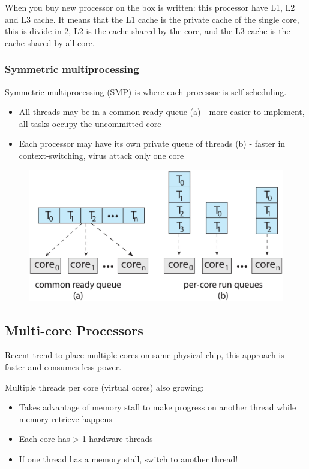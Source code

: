 When you buy new processor on the box is written: this processor have L1, L2 and L3 cache. It means that the L1 cache is the private cache of the single core, this is divide in 2, L2 is the cache shared by the core, and the L3 cache is the cache shared by all core.

\subsubsection{Symmetric multiprocessing}
Symmetric multiprocessing (SMP) is where each processor is self scheduling.

\begin{itemize}
    \item All threads may be in a common ready queue (a) - more easier to implement, all tasks occupy the uncommitted core
    \item Each processor may have its own private queue of threads (b) - faster in context-switching, virus attack only one core
\end{itemize}


\begin{figure}[htbp]
    \centering
    \includegraphics[width=0.55\linewidth]{img/SMP.png}   
    
\end{figure}


\subsection{Multi-core Processors}
Recent trend to place multiple cores on same physical chip, this approach is faster and consumes less power.

Multiple threads per core (virtual cores) also growing:

\begin{itemize}
    \item Takes advantage of memory stall to make progress on another thread while memory retrieve happens
    \item Each core has > 1 hardware threads
    \item If one thread has a memory stall, switch to another thread!
\end{itemize}

